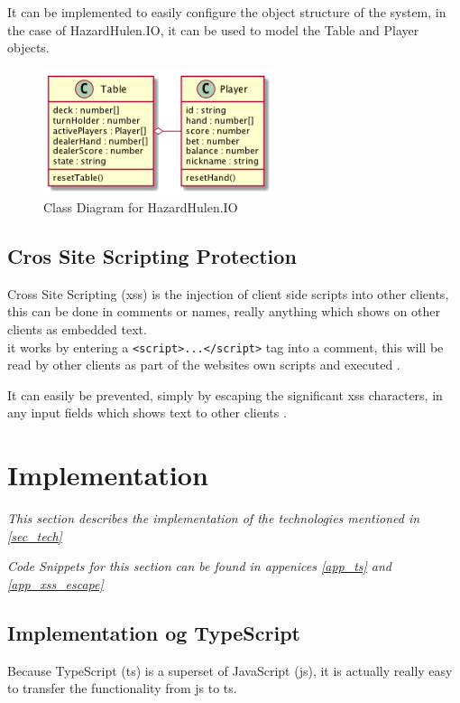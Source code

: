 \documentclass[a4paper]{article}
\begin{document}
It can be implemented to easily configure the object structure of the system, in the case of HazardHulen.IO, it can be used to model the Table and Player objects.

\begin{figure}[hbt]
  \centering
  \includegraphics[width=0.6\textwidth]{../UpdatedClassDiag}
  \caption{Class Diagram for HazardHulen.IO}
  \label{img_class_diag}
\end{figure}

\subsection{Cros Site Scripting Protection}
Cross Site Scripting (xss) is the injection of client side scripts into other clients, this can be done in comments or names, really anything which shows on other clients as embedded text.\\
it works by entering a \texttt{<script>...</script>} tag into a comment, this will be read by other clients as part of the websites own scripts and executed \cite{xss}.

It can easily be prevented, simply by escaping the significant xss characters, in any input fields which shows text to other clients \cite{xss-prep}.




\section{Implementation}
\label{sec_imp}
\textit{This section describes the implementation of the technologies mentioned in \autoref{sec_tech}\\}

\textit{Code Snippets for this section can be found in appenices \autoref{app_ts} and \autoref{app_xss_escape}}

\subsection{Implementation og TypeScript}
Because TypeScript (ts) is a superset of JavaScript (js), it is actually really easy to transfer the functionality from js to ts.
\end{document}
